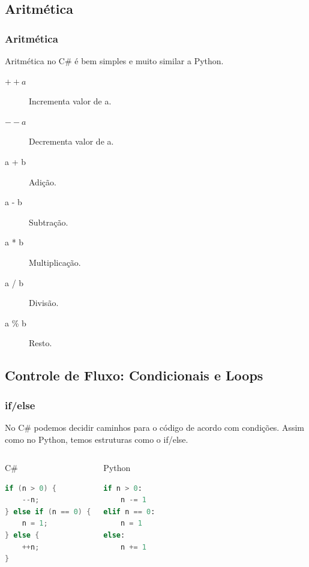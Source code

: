 \documentclass{beamer}
\begin{document}
	\subsection{Aritmética}
	\begin{frame}
		\frametitle{Aritmética}

		Aritmética no C\# é bem simples e muito similar a Python.

		\begin{description}
			\item[$++a$] Incrementa valor de a.
			\item[$--a$] Decrementa valor de a.
			\item[a + b] Adição.
			\item[a - b] Subtração.
			\item[a * b] Multiplicação.
			\item[a / b] Divisão.
			\item[a \% b] Resto.
		\end{description}
	\end{frame}

	\subsection{Controle de Fluxo: Condicionais e Loops}
	\begin{frame}[fragile]
		\frametitle{if/else}

		No C\# podemos decidir caminhos para o código de acordo com condições.
		Assim como no Python, temos estruturas como o if/else.

		\begin{columns}
			\begin{block}{C\#}
				\begin{lstlisting}[language=Java,basicstyle=\ttfamily,keywordstyle=\color{blue}]
if (n > 0) {
	--n;
} else if (n == 0) {
	n = 1;
} else {
	++n;
}
				\end{lstlisting}
			\end{block}
			\begin{block}{Python}
				\begin{lstlisting}[language=Python,basicstyle=\ttfamily,keywordstyle=\color{blue}]
if n > 0:
	n -= 1
elif n == 0:
	n = 1
else:
	n += 1
				\end{lstlisting}
			\end{block}
		\end{columns}
	\end{frame}
\end{document}

